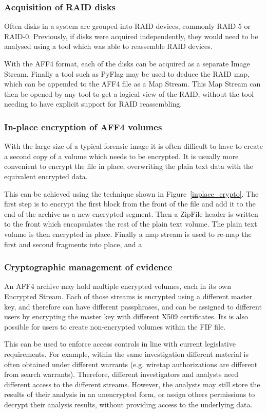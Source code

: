 \documentclass[10pt, conference]{IEEEtran}
\begin{document}
\subsubsection{Acquisition of RAID disks}
Often disks in a system are grouped into RAID devices, commonly RAID-5
or RAID-0. Previously, if disks were acquired independently, they
would need to be analysed using a tool which was able to reassemble
RAID devices.

With the AFF4 format, each of the disks can be acquired as a separate
Image Stream. Finally a tool such as PyFlag \cite{pyflag_raid} may be
used to deduce the RAID map, which can be appended to the AFF4 file as
a Map Stream. This Map Stream can then be opened by any tool to get a
logical view of the RAID, without the tool needing to have explicit
support for RAID reassembling.

\subsubsection{In-place encryption of AFF4 volumes}
With the large size of a typical forensic image it is often difficult
to have to create a second copy of a volume which needs to be
encrypted. It is usually more convenient to encrypt the file in place,
overwriting the plain text data with the equivalent encrypted data.

This can be achieved using the technique shown in
Figure~\ref{inplace_crypto}. The first step is to encrypt the first
block from the front of the file and add it to the end of the archive
as a new encrypted segment. Then a ZipFile header is written to the
front which encapsulates the rest of the plain text volume. The plain
text volume is then encrypted in place. Finally a map stream is used
to re-map the first and second fragments into place, and a 

\subsubsection{Cryptographic management of evidence}
An AFF4 archive may hold multiple encrypted volumes, each in its own
Encrypted Stream. Each of those streams is encrypted using a different
master key, and therefore can have different passphrases, and can be
assigned to different users by encrypting the master key with
different X509 certificates. Its is also possible for users to create
non-encrypted volumes within the FIF file.

This can be used to enforce access controls in line with current
legislative requirements. For example, within the same investigation
different material is often obtained under different warrants
(e.g. wiretap authorizations are different from search
warrants). Therefore, different investigators and analysts need
different access to the different streams. However, the analysts may
still store the results of their analysis in an unencrypted form, or
assign others permissions to decrypt their analysis results, without
providing access to the underlying data. 
\end{document}
